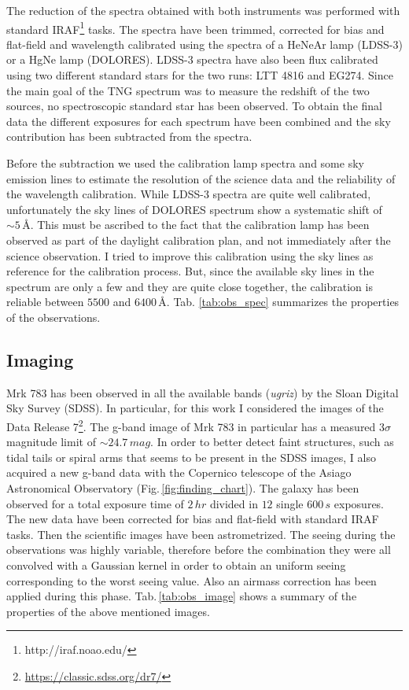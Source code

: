 \documentclass[../main.tex]{subfiles}
\begin{document}
The reduction of the spectra obtained with both instruments was performed with standard IRAF\footnote{http://iraf.noao.edu/} tasks.
The spectra have been trimmed, corrected for bias and flat-field and wavelength calibrated using the spectra of a HeNeAr lamp (LDSS-3) or a HgNe lamp (DOLORES).
LDSS-3 spectra have also been flux calibrated using two different standard stars for the two runs: LTT 4816 and EG274.
Since the main goal of the TNG spectrum was to measure the redshift of the two sources, no spectroscopic standard star has been observed.
To obtain the final data the different exposures for each spectrum have been combined and the sky contribution has been subtracted from the spectra.

Before the subtraction we used the calibration lamp spectra and some sky emission lines to estimate the resolution of the science data and the reliability of the wavelength calibration.
While LDSS-3 spectra are quite well calibrated, unfortunately the sky lines of DOLORES spectrum show a systematic shift of $\sim 5\,\si{\angstrom}$.
This must be ascribed to the fact that the calibration lamp has been observed as part of the daylight calibration plan, and not immediately after the science observation.
I tried to improve this calibration using the sky lines as reference for the calibration process.
But, since the available sky lines in the spectrum are only a few and they are quite close together, the calibration is reliable between $5500$ and $6400\,\si{\angstrom}$.
Tab. \ref{tab:obs_spec} summarizes the properties of the observations.

\subsection{Imaging}
\label{sec:obs_ima}

Mrk 783 has been observed in all the available bands (\emph{ugriz}) by the Sloan Digital Sky Survey (SDSS).
In particular, for this work I considered the images of the Data Release 7\footnote{\url{https://classic.sdss.org/dr7/}}.
The g-band image of Mrk 783 in particular has a measured $3\sigma$ magnitude limit of $\sim 24.7\,\si{mag}$.
In order to better detect faint structures, such as tidal tails or spiral arms that seems to be present in the SDSS images, I also acquired a new g-band data with the Copernico telescope of the Asiago Astronomical Observatory (Fig.\,\ref{fig:finding_chart}).
The galaxy has been observed for a total exposure time of $2\,\si{hr}$ divided in $12$ single $600\,\si{s}$ exposures. 
The new data have been corrected for bias and flat-field with standard IRAF tasks.
Then the scientific images have been astrometrized.
The seeing during the observations was highly variable, therefore before the combination they were all convolved with a Gaussian kernel in order to obtain an uniform seeing corresponding to the worst seeing value.
Also an airmass correction has been applied during this phase.
Tab.\,\ref{tab:obs_image} shows a summary of the properties of the above mentioned images.
\end{document}
